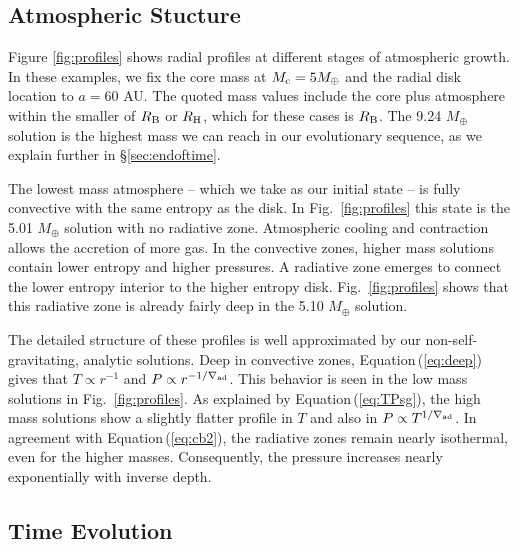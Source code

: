 \documentclass[apj, numberedappendix]{emulateapj}
\newcommand{\Eq}[1]{Equation\,(\ref{#1})}
\newcommand{\Fig}[1]{Fig.~\ref{#1}}
\newcommand{\delad}{\nabla_{\rm ad}}
\newcommand{\RB}{R_{\rm B}}
\newcommand{\RH}{R_{\rm H}}
\begin{document}
\subsection{Atmospheric Stucture}
\label{sec:profiles}
Figure \ref{fig:profiles} shows radial profiles at different stages of atmospheric growth.  In these examples, we fix the core mass at $M_{\rm{c}}=5 M_{\oplus}$ and the radial disk location to $a=60$ AU.  The quoted mass values include the core plus atmosphere within the smaller of $\RB$ or $\RH$, which for these cases is $\RB$.  The 9.24 $M_{\oplus}$ solution is the highest mass we can reach in our evolutionary sequence, as we explain further in \S\ref{sec:endoftime}.

The lowest mass atmosphere -- which we take as our initial state -- is fully convective with the same entropy as the disk.  In \Fig{fig:profiles} this state is the 5.01 $M_{\oplus}$ solution with no radiative zone.  Atmospheric cooling and contraction allows the accretion of more gas.  In the convective zones, higher mass solutions contain lower entropy and higher pressures.  A radiative zone emerges to connect the lower entropy interior to the higher entropy disk.  \Fig{fig:profiles} shows that this radiative zone is already fairly deep in the 5.10 $M_\oplus$ solution. 
 
The detailed structure of these profiles is well approximated by our non-self-gravitating, analytic solutions.  Deep in convective zones, \Eq{eq:deep} gives that $T \propto r^{-1}$ and $P\propto r^{-1/\delad}$.  This behavior is seen in the low mass solutions in \Fig{fig:profiles}.  As explained by \Eq{eq:TPsg}, the high mass solutions show a slightly flatter profile in $T$ and also in $P \propto T^{1/\delad}$.  In agreement with \Eq{eq:cb2}, the radiative zones remain nearly isothermal, even for the higher masses.  Consequently, the pressure increases nearly exponentially with inverse depth.  


\subsection{Time Evolution}\label{sec:timeev}
\end{document}
